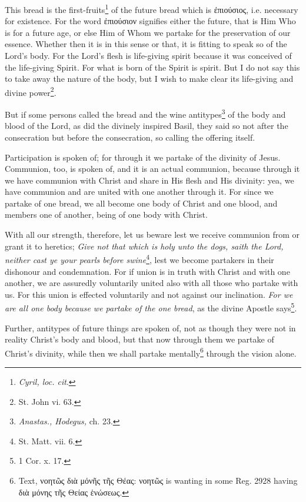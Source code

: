 This bread is the first-fruits\footnote{\emph{Cyril, loc. cit}.} of the future bread which is \textgreek{ἐπιούσιος}, i.e. necessary for existence. For the word \textgreek{ἐπιούσιον} signifies either the future, that is Him Who is for a future age, or else Him of Whom we partake for the preservation of our essence. Whether then it is in this sense or that, it is fitting to speak so of the Lord’s body. For the Lord’s flesh is life-giving spirit because it was conceived of the life-giving Spirit. For what is born of the Spirit is spirit. But I do not say this to take away the nature of the body, but I wish to make clear its life-giving and divine power\footnote{St. John vi. 63.}.

But if some persons called the bread and the wine antitypes\footnote{\emph{Anastas., Hodegus, }ch. 23.} of the body and blood of the Lord, as did the divinely inspired Basil, they said so not after the consecration but before the consecration, so calling the offering itself.

Participation is spoken of; for through it we partake of the divinity of Jesus. Communion, too, is spoken of, and it is an actual communion, because through it we have communion with Christ and share in His flesh and His divinity: yea, we have communion and are united with one another through it. For since we partake of one bread, we all become one body of Christ and one blood, and members one of another, being of one body with Christ.

With all our strength, therefore, let us beware lest we receive communion from or grant it to heretics; \emph{Give not that which is holy unto the dogs, saith the Lord, neither cast ye your pearls before swine}\footnote{St. Matt. vii. 6.}, lest we become partakers in their dishonour and condemnation. For if union is in truth with Christ and with one another, we are assuredly voluntarily united also with all those who partake with us. For this union is effected voluntarily and not against our inclination. \emph{For we are all one body because we partake of the one bread}, as the divine Apostle says\footnote{1 Cor. x. 17.}.

Further, antitypes of future things are spoken of, not as though they were not in reality Christ’s body and blood, but that now through them we partake of Christ’s divinity, while then we shall partake mentally\footnote{Text, \textgreek{νοητῶς διὰ μόνῆς τῆς Θέας: νοητῶς} is wanting in some Reg. 2928 having \textgreek{διὰ μόνης τῆς Θείας ἑνώσεως}.} through the vision alone.

